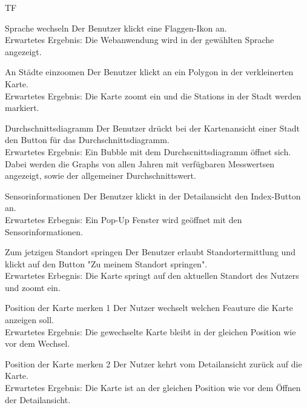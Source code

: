 \begin{Kriterien}{TF}
	
	\item[Sprache wechseln] Der Benutzer klickt eine Flaggen-Ikon an. \\ Erwartetes Ergebnis: Die Webanwendung wird in der gewählten Sprache angezeigt.
	
	\item[An Städte einzoomen] Der Benutzer klickt an ein Polygon in der verkleinerten Karte. \\ Erwartetes Ergebnis: Die Karte zoomt ein und die \glspl{Station} in der Stadt werden markiert.
	
	\item[Durchschnittsdiagramm] Der Benutzer drückt bei der Kartenansicht einer Stadt den Button für das Durchschnittsdiagramm. \\ Erwartetes Ergebnis: Ein Bubble mit dem Durchscnittsdiagramm öffnet sich. Dabei werden die \glspl{Graph} von allen Jahren mit verfügbaren \glspl{Messwert}en angezeigt, sowie der allgemeiner Durchschnittswert.
	
	\item[Sensorinformationen] Der Benutzer klickt in der Detailansicht den Index-Button an. \\ Erwartetes Erbegnis: Ein Pop-Up Fenster
wird geöffnet mit den Sensorinformationen.

	\item[Zum jetzigen Standort springen] Der Benutzer erlaubt Standortermittlung und klickt auf den Button "Zu meinem Standort springen". \\ Erwartetes Erbegnis: Die Karte springt auf den aktuellen Standort des Nutzers und zoomt ein.
	
	\item[Position der Karte merken 1] Der Nutzer wechselt welchen Feauture die Karte anzeigen soll. \\ 
	Erwartetes Ergebnis: Die gewechselte Karte bleibt in der gleichen Position wie vor dem Wechsel.
	
	\item[Position der Karte merken 2] Der Nutzer kehrt vom Detailansicht zurück auf die Karte. \\ 
	Erwartetes Ergebnis: Die Karte ist an der gleichen Position wie vor dem Öffnen der Detailansicht.
	
\end{Kriterien}
